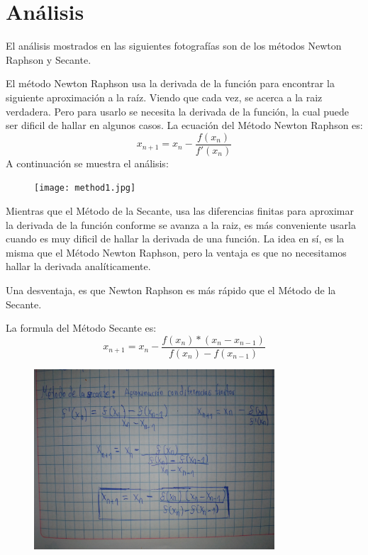\documentclass[a4paper,12pt]{article}
\begin{document}
    \section{Análisis}
    El análisis mostrados en las siguientes fotografías son de los métodos Newton Raphson y Secante.
    
    El método Newton Raphson usa la derivada de la función para encontrar la siguiente aproximación a la raíz.
    Viendo que cada vez, se acerca a la raiz verdadera. Pero para usarlo se necesita la derivada de la función, la cual 
    puede ser dificil de hallar en algunos casos. 
    La ecuación del Método Newton Raphson es:
    \begin{equation}
        x_{n+1} = x_n - \frac{f(x_n)}{f'(x_n)}
    \end{equation}
    A continuación se muestra el análisis:
    \begin{figure}[h]
        \centering 
        \texttt{[image: method1.jpg]}
    \end{figure}

    Mientras que el Método de la Secante, usa las diferencias finitas para aproximar la derivada de la función 
    conforme se avanza a la raiz, es más conveniente usarla cuando es muy dificil de hallar la derivada de una función.
    La idea en sí, es la misma que el Método Newton Raphson, pero la ventaja es que no necesitamos hallar la derivada analíticamente.

    Una desventaja, es que Newton Raphson es más rápido que el Método de la Secante.

    La formula del Método Secante es:
    \begin{equation}
        x_{n+1} = x_n - \frac{f(x_n)*(x_{n} - x_{n-1})}{f(x_n) - f(x_{n-1})}
    \end{equation}
    \newpage
    \begin{figure}[t]
        \centering 
        \includegraphics[width=0.8\textwidth]{method2.jpg}
    \end{figure}    
\end{document}
